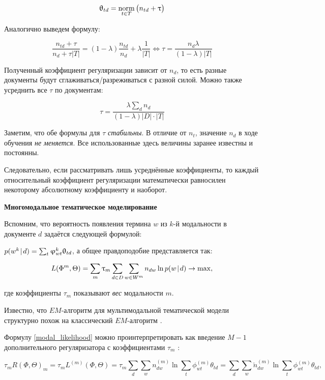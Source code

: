\[ 

\theta_{td} = \norm_{t \in T} \big( n_{td} + \tau \big) 

\] 

Аналогично выведем формулу: 

\[ 

\frac{n_{td} + \tau}{n_d + \tau |T|} = (1-\lambda) \frac{n_{td}}{n_d} + \lambda \frac{1}{|T|} \iff \tau = \frac{n_d \lambda}{(1-\lambda) |T|} \label{sp_theta_rel2abs}  

\] 

Полученный коэффициент регуляризации зависит от $n_d$, то есть разные документы будут сглаживаться/разреживаться с разной силой. Можно также усреднить все $\tau$ по документам: 

\[ 

\tau = \frac{\lambda \sum_d n_d }{(1-\lambda) |D| \cdot |T|}  

\] 

Заметим, что обе формулы для $\tau$ \textit{стабильны}. В отличие от $n_t$, значение $n_d$ в ходе обучения \emph{не меняется}. Все использованные здесь величины заранее известны и постоянны.  

Следовательно, если рассматривать лишь усреднённые коэффициенты, то каждый относительный коэффициент регуляризации математически равносилен некоторому абсолютному коэффициенту и наоборот.  

\textbf{Многомодальное тематическое моделирование} 

Вспомним, что вероятность появления термина $w$ из $k$-й модальности в документе $d$ задаётся следующей формулой: 

$p(w^k \mspace{2mu}{|}\mspace{2mu} d) = \sum_t \upvarphi_{wt}^k \uptheta_{td}$, а общее правдоподобие представляется так: 

\[ 

L(\Phi^m, \Theta) = \sum_m \tau_m \sum_{d\in D} \sum_{w \in W^m} n_{dw} \ln p(w \cond d) \rightarrow \max, \label{modal_likelihood} 

\] 

где коэффициенты $\tau_m$ показывают \textit{вес} модальности $m$.  

Известно, что $EM$-алгоритм для мультимодальной тематической модели структурно похож на классический $EM$-алгоритм \cite{yanina}\cite{vorontsov2015non}\cite{bulatov}.  

Формулу \ref{modal_likelihood} можно проинтерпретировать как введение $M-1$ дополнительного регуляризатора с коэффициентами $\tau_m$ \cite{yanina}: 

\[ 

\tau_m R(\Phi, \Theta)_m = \tau_m L^{(m)}(\Phi, \Theta) = \tau_m  \sum_d \sum_w n_{dw}^{(m)} \ln \sum_t \phi_{wt}^{(m)}\theta_{td} =  

\sum_d \sum_w \check{n}_{dw}^{(m)} \ln \sum_t \phi_{wt}^{(m)}\theta_{td}, 

\] 

